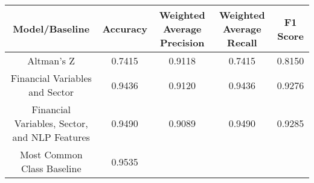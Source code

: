 \footnotesize
\begin{tabular}{ccccc}
\toprule
Model/Baseline & Accuracy & Weighted Average Precision & Weighted Average Recall & F1 Score \\
\midrule
Altman's Z & 0.7415 & 0.9118 & 0.7415 & 0.8150 \\
Financial Variables and Sector & 0.9436 & 0.9120 & 0.9436 & 0.9276 \\
Financial Variables, Sector, and NLP Features & 0.9490 & 0.9089 & 0.9490 & 0.9285 \\
Most Common Class Baseline & 0.9535 &  &  &  \\
\bottomrule
\end{tabular}

\normalsize